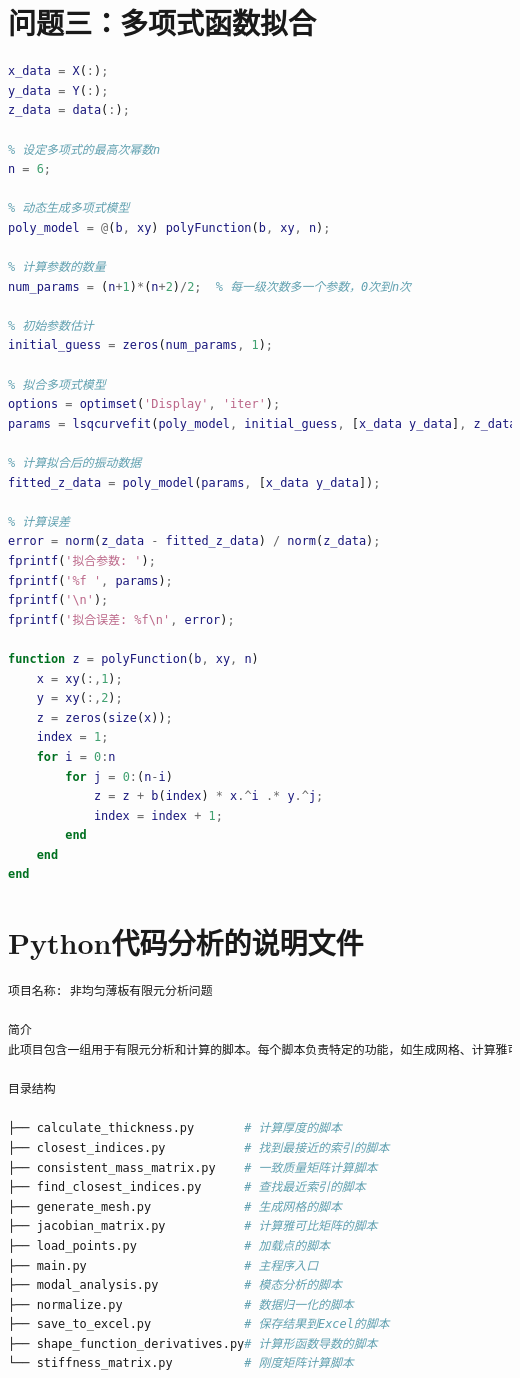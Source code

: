 \documentclass[withoutpreface,bwprint]{cumcmthesis} %
\begin{document}
\begin{appendices}
\begin{lstlisting}[language=matlab]
\end{lstlisting}
\section{问题三：多项式函数拟合}
\begin{lstlisting}[language=matlab]
x_data = X(:);
y_data = Y(:);
z_data = data(:); 

% 设定多项式的最高次幂数n
n = 6;  

% 动态生成多项式模型
poly_model = @(b, xy) polyFunction(b, xy, n);

% 计算参数的数量
num_params = (n+1)*(n+2)/2;  % 每一级次数多一个参数，0次到n次

% 初始参数估计
initial_guess = zeros(num_params, 1);

% 拟合多项式模型
options = optimset('Display', 'iter'); 
params = lsqcurvefit(poly_model, initial_guess, [x_data y_data], z_data, [], [], options);

% 计算拟合后的振动数据
fitted_z_data = poly_model(params, [x_data y_data]);

% 计算误差
error = norm(z_data - fitted_z_data) / norm(z_data);
fprintf('拟合参数: ');
fprintf('%f ', params);
fprintf('\n');
fprintf('拟合误差: %f\n', error);

function z = polyFunction(b, xy, n)
    x = xy(:,1);
    y = xy(:,2);
    z = zeros(size(x));
    index = 1;
    for i = 0:n
        for j = 0:(n-i)
            z = z + b(index) * x.^i .* y.^j;
            index = index + 1;
        end
    end
end
\end{lstlisting}
\section{Python代码分析的说明文件}\label{python}
\begin{lstlisting}[language=Python]
项目名称: 非均匀薄板有限元分析问题

简介
此项目包含一组用于有限元分析和计算的脚本。每个脚本负责特定的功能，如生成网格、计算雅可比矩阵、进行模态分析等。

目录结构

├── calculate_thickness.py       # 计算厚度的脚本
├── closest_indices.py           # 找到最接近的索引的脚本
├── consistent_mass_matrix.py    # 一致质量矩阵计算脚本
├── find_closest_indices.py      # 查找最近索引的脚本
├── generate_mesh.py             # 生成网格的脚本
├── jacobian_matrix.py           # 计算雅可比矩阵的脚本
├── load_points.py               # 加载点的脚本
├── main.py                      # 主程序入口
├── modal_analysis.py            # 模态分析的脚本
├── normalize.py                 # 数据归一化的脚本
├── save_to_excel.py             # 保存结果到Excel的脚本
├── shape_function_derivatives.py# 计算形函数导数的脚本
└── stiffness_matrix.py          # 刚度矩阵计算脚本


\end{lstlisting}
\end{appendices}
\end{document}

